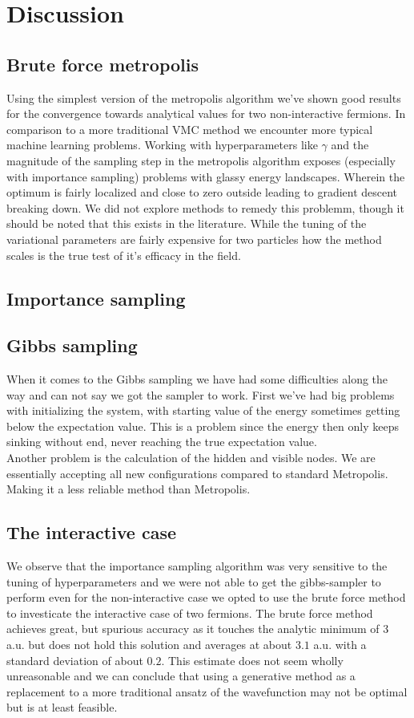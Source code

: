 \section{Discussion}
\subsection{Brute force metropolis}

Using the simplest version of the metropolis algorithm we've shown good results for the convergence towards analytical values for two non-interactive fermions. In comparison to a more traditional VMC method we encounter more typical machine learning problems. Working with hyperparameters like $\gamma$ and the magnitude of the sampling step in the metropolis algorithm exposes (especially with importance sampling) problems with glassy energy landscapes. Wherein the optimum is fairly localized and close to zero outside leading to gradient descent breaking down. We did not explore methods to remedy this problemm, though it should be noted  that this exists in the literature.  While the tuning of the variational parameters are fairly expensive for two particles how the method scales is the  true test of it's efficacy in the field. 

\subsection{Importance sampling}

\subsection{Gibbs sampling}
When it comes to the Gibbs sampling we have had some difficulties along the way and can not say we got the sampler to work.
First we've had big problems with initializing the system, with starting value of the energy sometimes getting below the expectation value. This is a problem since the energy then only keeps sinking without end, never reaching the true expectation value. \\
Another problem is the calculation of the hidden and visible nodes. We are essentially accepting all new configurations compared to standard Metropolis. Making it a less reliable method than Metropolis. 
\subsection{The interactive case}

We observe that the importance sampling algorithm was very sensitive to the tuning of hyperparameters and we were not able to get the gibbs-sampler to perform even for the non-interactive case we opted to use the brute force method to investicate the interactive case of two fermions. The brute force method achieves great, but spurious accuracy as it touches the analytic minimum of 3 a.u. but does not hold this solution and averages at about $3.1$ a.u. with a standard deviation of about $0.2$. This estimate does not seem wholly unreasonable  and we can conclude that using a generative method as a replacement to a more traditional ansatz of the wavefunction may not be optimal but is at least feasible. 
